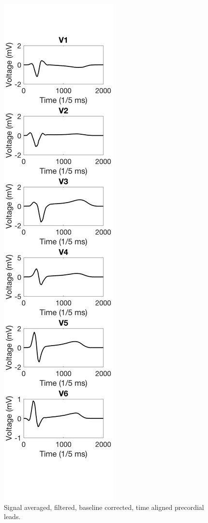 \documentclass[12pt]{article}
\begin{document}
\begin{figure}[H]
	
	\centering
	\includegraphics[height = .95\textheight]{Figures/Precordial_timeallign_sigaveraged.png}
	\caption{Signal averaged, filtered, baseline corrected, time aligned precordial leads.}
	\label{fig:PrecordSig}
\end{figure}
\end{document}
